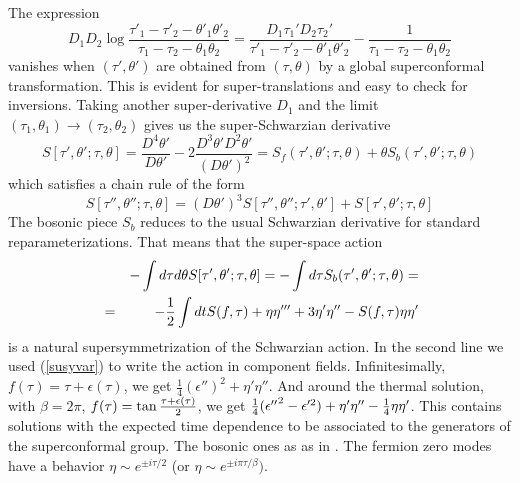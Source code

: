 \documentclass[aps,pre,preprint,onecolumn,citeautoscript,superscriptaddress,nofootinbib,eqsecnum]{revtex4-1}
\def\bea{\begin{eqnarray}}
\def\eea{\end{eqnarray}}
\def\nref#1{(\ref{#1})}
\def\half{{1 \over 2 }}
\begin{document}
The expression 
\begin{equation}
D_1 D_2 \log\frac{\tau'_1 - \tau'_2-\theta'_1 \theta'_2}{\tau_1 - \tau_2- \theta_1 \theta_2} = \frac{D_1 \tau_1'  D_2 \tau_2'}{\tau'_1 - \tau'_2-\theta'_1 \theta'_2} - \frac{1}{\tau_1 - \tau_2- \theta_1 \theta_2}
\end{equation}
vanishes when $(\tau', \theta')$ are obtained from $(\tau, \theta)$ by a global superconformal transformation.
This is evident for super-translations and easy to check for inversions. 
Taking another super-derivative $D_1$ and the limit $(\tau_1, \theta_1) \to (\tau_2, \theta_2)$ gives us 
the super-Schwarzian derivative 
\begin{equation}
S[\tau', \theta';\tau, \theta] = \frac{D^4 \theta'}{D \theta'} - 2 \frac{D^3 \theta' D^2 \theta'}{(D \theta')^2} = S_f(\tau', \theta';\tau, \theta) + \theta S_b(\tau', \theta';\tau, \theta)
\end{equation}
which satisfies a chain rule of the form 
\begin{equation}
S[\tau'', \theta'';\tau, \theta] = \left(D \theta' \right)^3 S[\tau'', \theta'';\tau', \theta'] + S[\tau', \theta';\tau, \theta] 
\end{equation}
The bosonic piece $S_b$ reduces to the usual Schwarzian derivative for standard reparameterizations. 
That means that the super-space action
\bea
& &- \int d \tau d \theta S[\tau', \theta';\tau, \theta] = -\int d\tau S_b(\tau', \theta';\tau, \theta)= 
\cr
&=&- \half \int dt S(f,\tau) + \eta \eta''' + 3 \eta' \eta'' - S(f,\tau) \eta \eta' \label{CompVar}
\eea
is a natural supersymmetrization of the Schwarzian action. In the second line we used  \nref{susyvar} to 
write the action in component fields. 
Infinitesimally, $f(\tau ) = \tau + \epsilon(\tau)$, we get 
$\frac{1}{4} (\epsilon'')^2 +   \eta'  \eta''$. 
And around the thermal solution, with $\beta = 2 \pi $,  $f(\tau) = \tan{ \tau + \epsilon(\tau) \over 2 } $, we get 
$ \frac{1}{4} ( {\epsilon'' }^2 - \epsilon'^2 ) +   \eta'  \eta'' - { 1\over 4} \eta \eta' $.
This contains solutions with the expected time dependence to be associated to the generators 
of the superconformal group. 
The bosonic ones as as in \cite{JMDS16}. The fermion zero modes have a behavior $\eta \sim e^{ \pm i \tau/2}$ (or 
$\eta \sim e^{ \pm i \pi \tau/\beta }) $. 
\end{document}
